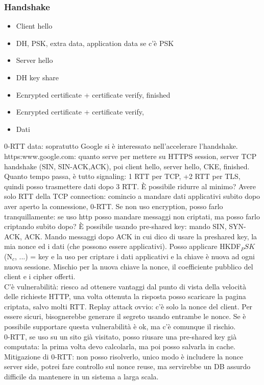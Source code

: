 \documentclass[16px]{article}
\begin{document}
\subsubsection{Handshake}
\begin{itemize}
\item Client hello
\item DH, PSK, extra data, application data se c'è PSK
\item Server hello
\item DH key share
\item Ecnrypted certificate + certificate verify, finished
\item Ecnrypted certificate + certificate verify,
\item Dati
\end{itemize}
0-RTT data: sopratutto Google si è interessato nell'accelerare l'handshake. https:www.google.com: quanto serve per mettere su HTTPS session, server TCP handshake (SIN, SIN-ACK,ACK), poi client hello, server hello, CKE, finished. Quanto tempo passa, è tutto signaling: 1 RTT per TCP, +2 RTT per TLS, quindi posso trasmettere dati dopo 3 RTT. È possibile ridurre al minimo? Avere solo RTT della TCP connection: comincio a mandare dati applicativi subito dopo aver aperto la connessione, 0-RTT. Se non uso encryption, posso farlo tranquillamente: se uso http posso mandare messaggi non criptati, ma posso farlo criptando subito dopo? È possibile usando pre-shared key: mando SIN, SYN-ACK, ACK. Mando messaggi dopo ACK in cui dico di usare la preshared key, la mia nonce ed i dati (che possono essere applicativi). Posso applicare HKDF$_PSK$(N$_c$, ...) = key e la uso per criptare i dati applicativi e la chiave è nuova ad ogni nuova sessione. Mischio per la nuova chiave la nonce, il coefficiente pubblico del client e i cipher offerti.\\ C'è vulnerabilità: riesco ad ottenere vantaggi dal punto di vista della velocità delle richieste HTTP, una volta ottenuta la risposta posso scaricare la pagina criptata, salvo molti RTT. Replay attack ovvio: c'è solo la nonce del client. Per essere sicuri, bisognerebbe generare il segreto usando entrambe le nonce. Se è possibile supportare questa vulnerabilità è ok, ma c'è comunque il rischio.\\ 0-RTT, se uso su un sito già visitato, posso riusare una pre-shared key già computata: la prima volta devo calcolarla, ma poi posso salvarla in cache.\\ Mitigazione di 0-RTT: non posso risolverlo, unico modo è includere la nonce server side, potrei fare controllo sul nonce reuse, ma servirebbe un DB assurdo difficile da mantenere in un sistema a larga scala.
\end{document}
